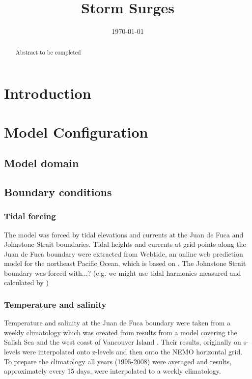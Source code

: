 \documentclass[pdftex,12pt]{article}
\title{Storm Surges}
\date{\today}
\begin{document}
\maketitle

\begin{abstract}
Abstract to be completed
\end{abstract}

\section{Introduction}\label{sec:intro}
\citep{masson2004modelling} %

\section{Model Configuration}
\subsection{Model domain}

\subsection{Boundary conditions}

\subsubsection{Tidal forcing} %
The model was forced by tidal elevations and currents at the Juan de Fuca and Johnstone Strait boundaries. Tidal heights and currents at grid points along the Juan de Fuca boundary were extracted from Webtide, an online web prediction model for the northeast Pacific Ocean, which is based on \citep{foreman2000webtide}. The Johnstone Strait boundary was forced with...? (e.g. we might use tidal harmonics measured and calculated by \citep{thomson1980johnstone})

\subsubsection{Temperature and salinity}
Temperature and salinity at the Juan de Fuca boundary were taken from a weekly climatology which was created from results from a model covering the Salish Sea and the west coast of Vancouver Island \citep{massonfine2012}.  Their results, originally on s-levels were interpolated onto z-levels and then onto the NEMO horizontal grid.  To prepare the climatology all years (1995-2008) were averaged and results, approximately every 15 days, were interpolated to a weekly climatology.
\end{document}

